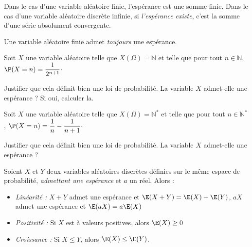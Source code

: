 \documentclass[a4paper,10pt]{report}
\begin{document}
\medskip

\begin{rems}
\item Dans le cas d'une variable aléatoire finie, l'espérance est une somme finie. Dans le cas d'une variable aléatoire discrète infinie, si \textit{l'espérance existe}, c'est la somme d'une série absolument convergente.
\item Une variable aléatoire finie admet \textit{toujours} une espérance.
\end{rems}

\begin{ex} Soit $X$ une variable aléatoire telle que $X(\Omega) = \mathbb{N}$ et telle que pour tout $n \in \mathbb{N}$, $\P(X=n)= \dfrac{1}{2^{n+1}} \cdot$

\noindent Justifier que cela définit bien une loi de probabilité. La variable $X$ admet-elle une espérance ? Si oui, calculer la.

\vspace{11.3cm}
\end{ex}

\begin{exa} Soit $X$ une variable aléatoire telle que $X(\Omega) = \mathbb{N}^*$ et telle que pour tout $n \in \mathbb{N}^*$, $\P(X=n)= \dfrac{1}{n}- \dfrac{1}{n+1} \cdot$

\noindent Justifier que cela définit bien une loi de probabilité. La variable $X$ admet-elle une espérance ? 
\end{exa}

\begin{prop}
Soient $X$ et $Y$ deux variables aléatoires discrètes définies sur le même espace de probabilité, \textit{admettant une espérance} et $a$ un réel. Alors : 
\begin{itemize}
\item \textit{Linéarité :} $X+Y$ admet une espérance et $\E(X+Y) = \E(X)+\E(Y)$, $aX$ admet une espérance et $\E(aX)=a \E(X)$
\item \textit{Positivité :} Si $X$ est à valeurs positives, alors $\E(X) \geq 0 $
\item \textit{Croissance :} Si $X \le Y$, alors $\E(X) \leq \E(Y)$.
\end{itemize}
\end{prop}

\begin{preuve}

\vspace{5cm}
\end{preuve}
\end{document}
